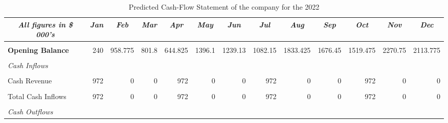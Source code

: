 \begin{table}[htbp]
  \centering
  \caption{Predicted Cash-Flow Statement of the company for the 2022}
    \begin{tabular}{|l|r|r|r|r|r|r|r|r|r|r|r|r|}
    \toprule
    \multicolumn{1}{|c|}{\textit{\textbf{All figures in \$ 000's}}} & \multicolumn{1}{c|}{\textit{\textbf{Jan}}} & \multicolumn{1}{c|}{\textit{\textbf{Feb}}} & \multicolumn{1}{c|}{\textit{\textbf{Mar}}} & \multicolumn{1}{c|}{\textit{\textbf{Apr}}} & \multicolumn{1}{c|}{\textit{\textbf{May }}} & \multicolumn{1}{c|}{\textit{\textbf{Jun}}} & \multicolumn{1}{c|}{\textit{\textbf{Jul}}} & \multicolumn{1}{c|}{\textit{\textbf{Aug}}} & \multicolumn{1}{c|}{\textit{\textbf{Sep}}} & \multicolumn{1}{c|}{\textit{\textbf{Oct}}} & \multicolumn{1}{c|}{\textit{\textbf{Nov}}} & \multicolumn{1}{c|}{\textit{\textbf{Dec}}} \\
    \midrule
          &       &       &       &       &       &       &       &       &       &       &       &  \\
    \midrule
    \textbf{Opening Balance} & 240   & 958.775 & 801.8 & 644.825 & 1396.1 & 1239.13 & 1082.15 & 1833.425 & 1676.45 & 1519.475 & 2270.75 & 2113.775 \\
    \midrule
          &       &       &       &       &       &       &       &       &       &       &       &  \\
    \midrule
    \textit{Cash Inflows} &       &       &       &       &       &       &       &       &       &       &       &  \\
    \midrule
          &       &       &       &       &       &       &       &       &       &       &       &  \\
    \midrule
    Cash Revenue & 972   & 0     & 0     & 972   & 0     & 0     & 972   & 0     & 0     & 972   & 0     & 0 \\
    \midrule
          &       &       &       &       &       &       &       &       &       &       &       &  \\
    \midrule
    Total Cash Inflows & 972   & 0     & 0     & 972   & 0     & 0     & 972   & 0     & 0     & 972   & 0     & 0 \\
    \midrule
          &       &       &       &       &       &       &       &       &       &       &       &  \\
    \midrule
    \textit{Cash Outflows} &       &       &       &       &       &       &       &       &       &       &       &  \\

\end{tabular}
\end{table}
